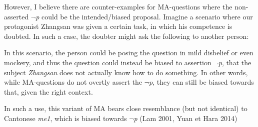 \documentclass[12pt, UTF8]{article}
\begin{document}
However, I believe there are counter-examples for MA-questions where the non-asserted $\neg$\textit{p} could be the intended/biased proposal. Imagine a scenario where our protagonist Zhangsan was given a certain task, in which his competence is doubted. In such a case, the doubter might ask the following to another person:

\begin{exe}
\end{exe}

In this scenario, the person could be posing the question in mild disbelief or even mockery, and thus the question could instead be biased to assertion $\neg$\textit{p}, that the subject \textit{Zhangsan} does not actually know how to do something. In other words, while MA-questions do not overtly assert the $\neg$\textit{p}, they can still be biased towards that, given the right context. 


In such a use, this variant of MA bears close resemblance (but not identical) to Cantonese \textit{me1}, which is biased towards $\neg$\textit{p} (Lam 2001, Yuan et Hara 2014)

\begin{exe}
\end{exe}

\end{document}
